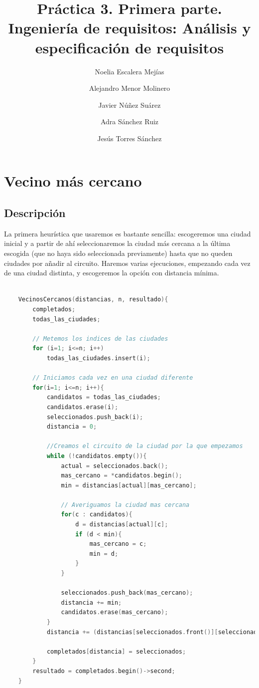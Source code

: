 \documentclass{article}
\title{Práctica 3. Primera parte. Ingeniería de requisitos: Análisis y especificación de requisitos}
\author{Noelia Escalera Mejías\\
	\and Alejandro Menor Molinero\\
	\and Javier Núñez Suárez\\
	\and Adra Sánchez Ruiz\\
	\and Jesús Torres Sánchez}
\begin{document}
	\maketitle
	
	\section{Vecino más cercano}
	\subsection{Descripción}
	La primera heurística que usaremos es bastante sencilla: escogeremos una ciudad inicial y a partir de ahí seleccionaremos la ciudad más cercana a la última escogida (que no haya sido seleccionada previamente) hasta que no queden ciudades por añadir al circuito. Haremos varias ejecuciones, empezando cada vez de una ciudad distinta, y escogeremos la opción con distancia mínima.
	\begin{lstlisting}[caption=Pseudocódigo de la primera heurística, language=c]
	
	VecinosCercanos(distancias, n, resultado){
		completados;
		todas_las_ciudades;
		
		// Metemos los indices de las ciudades
		for (i=1; i<=n; i++)
			todas_las_ciudades.insert(i);
			
		// Iniciamos cada vez en una ciudad diferente
		for(i=1; i<=n; i++){
			candidatos = todas_las_ciudades;
			candidatos.erase(i);
			seleccionados.push_back(i);
			distancia = 0;
			
			//Creamos el circuito de la ciudad por la que empezamos
			while (!candidatos.empty()){
				actual = seleccionados.back();
				mas_cercano = *candidatos.begin();
				min = distancias[actual][mas_cercano];
				
				// Averiguamos la ciudad mas cercana
				for(c : candidatos){
					d = distancias[actual][c];
					if (d < min){
						mas_cercano = c;
						min = d;
					}
				}
				
				seleccionados.push_back(mas_cercano);
				distancia += min;
				candidatos.erase(mas_cercano);
			}
			distancia += (distancias[seleccionados.front()][seleccionados.back()]);
			
			completados[distancia] = seleccionados;
		}
		resultado = completados.begin()->second;
	}

	\end{lstlisting}
\end{document}
